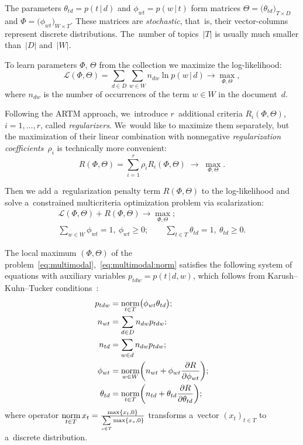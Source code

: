 \documentclass{sig-alternate}
\newcommand{\norm}{\mathop{\rm norm}\limits}
\newcommand{\cond}{\mspace{3mu}{|}\mspace{3mu}}
\newcommand{\cL}{\mathscr{L}}
\begin{document}
The parameters
${\theta_{td}=p(t\cond d)}$ and ${\phi_{wt}=p(w\cond t)}$
form matrices
${\Theta = \bigl( \theta_{td} \bigr)_{T\times D}}$ and
${\Phi = \bigl( \phi_{wt} \bigr)_{W\times T}}$.
These matrices are \emph{stochastic},
that~is, their vector-columns represent discrete distributions.
The~number of topics~$|T|$ is usually much smaller than~$|D|$ and~$|W|$.

To learn parameters $\Phi$, $\Theta$ from the collection
we maximize the log-likelihood:
\[
    \cL (\Phi,\Theta) =
    \sum_{d\in D}\sum_{w\in W} n_{dw} \ln p(w\cond d)
    \to \max_{\Phi,\Theta},
\]
where
$n_{dw}$ is the number of occurrences of the term ${w\in W}$ in the document~$d$.

Following the ARTM approach,
we~introduce $r$~additional criteria
$R_i(\Phi,\Theta)$,\; ${i=1,\dots,r}$,
called \emph{regularizers}.
We~would like to maximize them separately,
but the maximization of their linear combination
with nonnegative \emph{regularization coefficients}~$\rho_i$
is technically more convenient:
\[
    R(\Phi,\Theta) =
    \sum_{i=1}^r \rho_i R_i(\Phi,\Theta)
    \;\to\; \max_{\Phi,\Theta}.
\]

Then we add a~regularization penalty term $R(\Phi,\Theta)$ to the log-likelihood
and solve a~constrained multicriteria optimization problem via scalarization:
\begin{gather}
\label{eq:ARTM}
    \cL (\Phi,\Theta) + R(\Phi,\Theta) \to \max_{\Phi,\Theta};
\\\label{eq:ARTM:norm}
    \sum_{w\in W}\!\!\! \phi_{wt} = 1,~
    \phi_{wt}\geq 0;
    \qquad
    \sum_{t\in T} \theta_{td} = 1,~
    \theta_{td}\geq 0.
\end{gather}

The local maximum $(\Phi,\Theta)$
of the problem~\eqref{eq:multimodal},~\eqref{eq:multimodal:norm}
satisfies the following system of equations
with auxiliary variables $p_{tdw} = p(t\cond d,w)$,
which follows from Karush--Kuhn--Tucker conditions~\cite{voron14aist}:
\begin{align}
    \label{eq:ARTM:Estep}
    p_{tdw} &= \norm_{t\in T} \bigl(\phi_{wt}\theta_{td}\bigr);
\\\notag
    n_{wt} &= \sum_{d\in D} n_{dw} p_{tdw};
\\\notag
    n_{td} &= \sum_{w\in d} n_{dw} p_{tdw};
\\
    \label{eq:ARTM:Mstep:phi}
    \phi_{wt} &= \norm_{w\in W}
        \biggl(
            n_{wt} + \phi_{wt} \frac{\partial R}{\partial \phi_{wt}}
        \biggr);
\\
    \label{eq:ARTM:Mstep:theta}
    \theta_{td} &= \norm_{t\in T}
        \biggl(
            n_{td} + \theta_{td} \frac{\partial R}{\partial \theta_{td}}
        \biggr);
\end{align}
where operator
$\norm_{t\in T} x_t = \frac{\max\{x_t,0\}}{\sum\limits_{s\in T} \max\{x_s,0\}}$
transforms a~vector $(x_t)_{t\in T}$ to a~discrete distribution.
\end{document}
